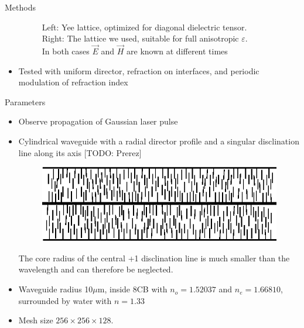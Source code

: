 \documentclass{beamer}
\newlength{\wideitemsep}
\let\olditem\item
\renewcommand{\item}{\setlength{\itemsep}{\wideitemsep}\olditem}
\newcommand{\blockpadding}{
  \rule[-0.6ex]{0pt}{2.5ex}
}
\begin{document}
\begin{columns}[t]
\begin{column}{.36\textwidth}
\begin{block}{\blockpadding Methods}
\begin{itemize}
\begin{figure}[h]
{}
\label{fig:lattice}
\caption{{\color{dark} Left:} Yee lattice, optimized for diagonal dielectric tensor. \\{\color{dark} Right:} The lattice we used, suitable for full anisotropic $\varepsilon$. \\In both cases $\vec E$ and $\vec H$ are known at different times}
\end{figure}
  \item Tested with uniform director, refraction on interfaces, and periodic modulation of refraction index
  \end{itemize}
  \end{block}
  
  \begin{block}{\blockpadding Parameters}
  \begin{itemize}
  \item Observe propagation of Gaussian laser pulse

\item Cylindrical waveguide with a radial director profile and a singular disclination line along its axis [TODO: Prerez] \\
\begin{figure}[h]
\centering
\includegraphics[width=.5\textwidth]{../Magisterij/Slike/director-profile-radial}
\end{figure}
The core radius of the central +1 disclination line is much smaller than the wavelength and can therefore be neglected. 
\item Waveguide radius 10$\mu$m, inside 8CB with $n_o = 1.52037$ and $n_e = 1.66810$, surrounded by water with $n = 1.33$
\item Mesh size $256 \times 256 \times 128$.


\end{itemize}
\end{block}
\end{column}
\end{columns}
\end{document}
